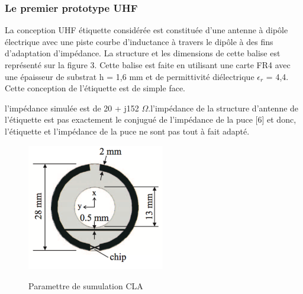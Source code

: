 \documentclass[11pt, a4paper, twoside]{book}
\begin{document}
\subsubsection{Le premier prototype UHF}


La conception UHF étiquette considérée est constituée d’une antenne à dipôle électrique avec une piste courbe d’inductance à travers le dipôle à des fins d'adaptation d'impédance. La structure et les dimensions de cette balise est représenté sur la figure 3. Cette balise est faite en utilisant une carte FR4 avec une épaisseur de substrat h = 1,6 mm et de permittivité diélectrique \(\epsilon_{r}\) = 4,4. Cette conception de l’étiquette est de simple face.

 l'impédance simulée est de 20 + j152 \(\Omega\).l'impédance de la structure d'antenne de l'étiquette est pas exactement le conjugué de l'impédance de la puce [6] et donc, l'étiquette et l'impédance de la puce ne sont pas tout à fait adapté.\\
 
 \begin{figure}[H]
\centering
\includegraphics[width=6cm]{dofi}\\
\caption{Paramettre de sumulation CLA}
\end{figure} 
\end{document}
